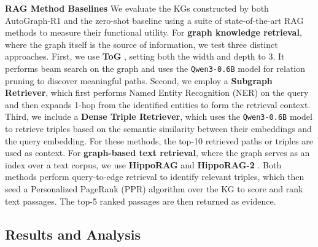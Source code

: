 \documentclass[11pt]{article}
\begin{document}
\textbf{RAG Method Baselines} We evaluate the KGs constructed by both AutoGraph-R1 and the zero-shot baseline using a suite of state-of-the-art RAG methods to measure their functional utility. For \textbf{graph knowledge retrieval}, where the graph itself is the source of information, we test three distinct approaches. First, we use \textbf{ToG} \citep{sun_think--graph_2024}, setting both the width and depth to 3. It performs beam search on the graph and uses the \texttt{Qwen3-0.6B} model for relation pruning to discover meaningful paths. Second, we employ a \textbf{Subgraph Retriever}, which first performs Named Entity Recognition (NER) on the query and then expands 1-hop from the identified entities to form the retrieval context. Third, we include a \textbf{Dense Triple Retriever}, which uses the \texttt{Qwen3-0.6B} model to retrieve triples based on the semantic similarity between their embeddings and the query embedding. For these methods, the top-10 retrieved paths or triples are used as context. For \textbf{graph-based text retrieval}, where the graph serves as an index over a text corpus, we use \textbf{HippoRAG} \citep{gutierrez_hipporag_2025} and \textbf{HippoRAG-2} \citep{gutierrez_rag_2025}. Both methods perform query-to-edge retrieval to identify relevant triples, which then seed a Personalized PageRank (PPR) algorithm over the KG to score and rank text passages. The top-5 ranked passages are then returned as evidence.

\subsection{Results and Analysis}
\end{document}
